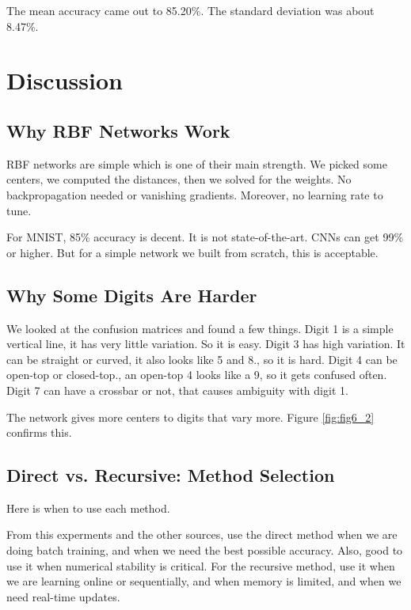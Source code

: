 \documentclass[12pt]{article}
\begin{document}
The mean accuracy came out to 85.20\%. The standard deviation was about 8.47\%.
	


\section{Discussion}

\subsection{Why RBF Networks Work}

RBF networks are simple which is one of their main strength. We picked some centers, we computed the distances, then we solved for the weights. No backpropagation needed or vanishing gradients. Moreover, no learning rate to tune.

For MNIST, 85\% accuracy is decent. It is not state-of-the-art. CNNs can get 99\% or higher. But for a simple network we built from scratch, this is acceptable.

\subsection{Why Some Digits Are Harder}

We looked at the confusion matrices and found a few things. Digit 1 is a simple vertical line, it has very little variation. So it is easy. Digit 3 has high variation. It can be straight or curved, it also looks like 5 and 8., so it is hard. Digit 4 can be open-top or closed-top., an open-top 4 looks like a 9, so it gets confused often. Digit 7 can have a crossbar or not, that causes ambiguity with digit 1.

The network gives more centers to digits that vary more. Figure \ref{fig:fig6_2} confirms this.

\subsection{Direct vs. Recursive: Method Selection}

Here is when to use each method.

From this experments and the other sources, use the direct method when we are doing batch training, and when we need the best possible accuracy. Also, good to use it when numerical stability is critical. For the recursive method, use it when we are learning online or sequentially, and when memory is limited, and when we need real-time updates.
\end{document}
